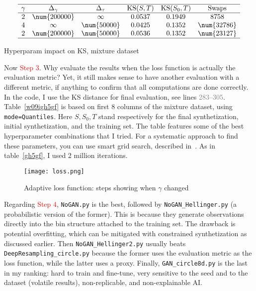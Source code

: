 \documentclass[oneside,10pt]{book}
\begin{document}
\begin{table}[H]
\small
\[
\begin{array}{cccccc}
\hline
\gamma & \Delta_\gamma & \Delta_\tau &\text{KS($S,T$)}	&	\text{KS($S_0, T$)} & \text{Swaps}	\\
\hline
 2 & \num{200000} & \infty &  0.0537 & 0.1949 & 8758 \\
 4 & \infty & \num{50000} &  0.0425 & 0.1352 & \num{32786} \\
 2 & \num{200000} & \num{50000}  & 0.0536   & 0.1352 & \num{23127} \\

\hline
\end{array}
\]
\caption{\label{w09igh5gf}Hyperparam impact on KS, mixture dataset}
\end{table}



Now \textcolor{red}{Step 3}.  Why evaluate the results when the loss function is actually the evaluation metric? Yet,
it still makes sense to have another evaluation with a different metric, if anything to confirm that all computations are done correctly. 
In the code, I use the KS distance for final evaluation, see lines \textcolor{gray}{283--305}. 
Table~\ref{w09igh5gf} is based on first 8 columns of the mixture dataset,
 using \texttt{mode=\textquotesingle Quantiles\textquotesingle}. Here $S, S_0,T$ stand respectively for the final synthetization, initial synthetization, and the
 training set.  
The table features some of the best hyperparameter combinations that I tried.
For a systematic approach to find these parameters, you can use \textcolor{index}{smart grid search}, 
described  in~\cite{vgsmart}. As in table~\ref{gh5gf}, I used 2 million iterations.


\begin{figure}[H]
\centering
\texttt{[image: loss.png]}   
\caption{Adaptive loss function: steps showing when $\gamma$ changed}
\label{fig:xyerwsalk}
\end{figure}

Regarding \textcolor{red}{Step 4}, \texttt{NoGAN.py} is the best, followed by \texttt{NoGAN\_Hellinger.py} (a probabilistic version of the former). 
This is because they generate observations directly into
 the bin structure attached to the training set. The drawback is potential overfitting, which can be mitigated with 
\textcolor{index}{constrained synthetization} as discussed earlier. Then \texttt{NoGAN\_Hellinger2.py} usually beats \texttt{DeepResampling\_circle.py}
 because the former uses the evaluation metric as the loss function, while the latter uses a proxy. Finally,
 \texttt{GAN\_circle8d.py} is the last in my ranking: hard to train and fine-tune, 
very sensitive to the seed and to the dataset (volatile results), non-replicable, and non-explainable AI. 
\end{document}
